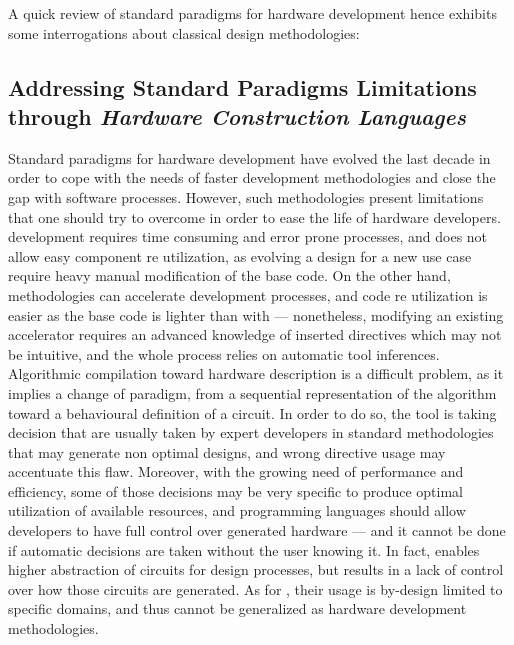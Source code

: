         A quick review of standard paradigms for hardware development hence exhibits some interrogations about classical design methodologies:

    \subsection[Hardware Construction Languages]{Addressing Standard Paradigms Limitations through {\it Hardware Construction Languages}}
    \label{ch.problem:sec.hardware:ssec.hcl}
        Standard paradigms for hardware development have evolved the last decade in order to cope with the needs of faster development methodologies and close the gap with software processes.
        However, such methodologies present limitations that one should try to overcome in order to ease the life of hardware developers.
         development requires time consuming and error prone processes, and does not allow easy component re utilization, as evolving a design for a new use case require heavy manual modification of the base code. 
        On the other hand,  methodologies can accelerate development processes, and code re utilization is easier as the base code is lighter than with  --- nonetheless, modifying an existing accelerator requires an advanced knowledge of inserted directives which may not be intuitive, and the whole process relies on automatic tool inferences.
        Algorithmic compilation toward hardware description is a difficult problem, as it implies a change of paradigm, from a sequential representation of the algorithm toward a behavioural definition of a circuit. 
        In order to do so, the tool is taking decision that are usually taken by expert developers in standard  methodologies that may generate non optimal designs, and wrong directive usage may accentuate this flaw.
        Moreover, with the growing need of performance and efficiency, some of those decisions may be very specific to produce optimal utilization of available resources, and programming languages should allow developers to have full control over generated hardware --- and it cannot be done if automatic decisions are taken without the user knowing it.
        In fact,  enables higher abstraction of circuits for design processes, but results in a lack of control over how those circuits are generated.
        As for , their usage is by-design limited to specific domains, and thus cannot be generalized as hardware development methodologies.

